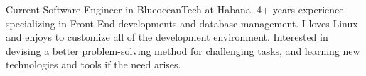 

\begin{cvparagraph}

Current Software Engineer in BlueoceanTech at Habana. 4+ years experience specializing in Front-End developments and database management. I loves Linux and enjoys to customize all of the development environment. Interested in devising a better problem-solving method for challenging tasks, and learning new technologies and tools if the need arises.
\end{cvparagraph}
